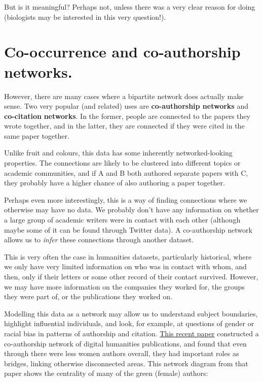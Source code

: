 \documentclass[
]{book}
\begin{document}
But is it meaningful? Perhaps not, unless there was a very clear reason for doing (biologists may be interested in this very question!).

\hypertarget{co-occurrence-and-co-authorship-networks.}{%
\section{Co-occurrence and co-authorship networks.}\label{co-occurrence-and-co-authorship-networks.}}

However, there are many cases where a bipartite network does actually make sense. Two very popular (and related) uses are \textbf{co-authorship networks} and \textbf{co-citation} \textbf{networks}. In the former, people are connected to the papers they wrote together, and in the latter, they are connected if they were cited in the same paper together.

Unlike fruit and colours, this data has some inherently networked-looking properties. The connections are likely to be clustered into different topics or academic communities, and if A and B both authored separate papers with C, they probably have a higher chance of also authoring a paper together.

Perhaps even more interestingly, this is a way of finding connections where we otherwise may have no data. We probably don't have any information on whether a large group of academic writers were in contact with each other (although maybe some of it can be found through Twitter data). A co-authorship network allows us to \emph{infer} these connections through another dataset.

This is very often the case in humanities datasets, particularly historical, where we only have very limited information on who was in contact with whom, and then, only if their letters or some other record of their contact survived. However, we may have more information on the companies they worked for, the groups they were part of, or the publications they worked on.

Modelling this data as a network may allow us to understand subject boundaries, highlight influential individuals, and look, for example, at questions of gender or racial bias in patterns of authorship and citation. \href{https://doi.org/10.1108/JD-11-2021-0221}{This recent paper} constructed a co-authorship network of digital humanities publications, and found that even through there were less women authors overall, they had important roles as bridges, linking otherwise disconnected areas. This network diagram from that paper shows the centrality of many of the green (female) authors:
\end{document}
